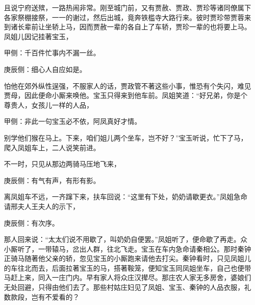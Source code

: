 \begin{parag}
    且说宁府送殡，一路热闹非常。刚至城门前，又有贾赦、贾政、贾珍等诸同僚属下各家祭棚接祭，一一的谢过，然后出城，竟奔铁槛寺大路行来。彼时贾珍带贾蓉来到诸长辈前让坐轿上马，因而贾赦一辈的各自上了车轿，贾珍一辈的也将要上马。凤姐儿因记挂著宝玉，\begin{note}甲侧：千百件忙事内不漏一丝。\end{note}\begin{note}庚辰侧：细心人自应如是。\end{note}怕他在郊外纵性逞强，不服家人的话，贾政管不著这些小事，惟恐有个失闪，难见贾母，因此便命小厮来唤他。宝玉只得来到他车前。凤姐笑道：“好兄弟，你是个尊贵人，女孩儿一样的人品，\begin{note}甲侧：非此一句宝玉必不依，阿凤真好才情。\end{note}别学他们猴在马上。下来，咱们姐儿两个坐车，岂不好？”宝玉听说，忙下了马，爬入凤姐车上，二人说笑前进。
\end{parag}


\begin{parag}
    不一时，只见从那边两骑马压地飞来，\begin{note}庚辰侧：有气有声，有形有影。\end{note}离凤姐车不远，一齐蹿下来，扶车回说：“这里有下处，奶奶请歇更衣。”凤姐急命请邢夫人王夫人的示下，\begin{note}庚辰侧：有次序。\end{note}那人回来说：“太太们说不用歇了，叫奶奶自便罢。”凤姐听了，便命歇了再走。众小厮听了，一带辕马，岔出人群，往北飞走。宝玉在车内急命请秦相公。那时秦钟正骑马随著他父亲的轿，忽见宝玉的小厮跑来请他去打尖。秦钟看时，只见凤姐儿的车往北而去，后面拉著宝玉的马，搭著鞍笼，便知宝玉同凤姐坐车，自己也便带马赶上来，同入一庄门内。早有家人将众庄汉撵尽。那庄农人家无多房舍，婆娘们无处回避，只得由他们去了。那些村姑庄妇见了凤姐、宝玉、秦钟的人品衣服，礼数款段，岂有不爱看的？
\end{parag}


